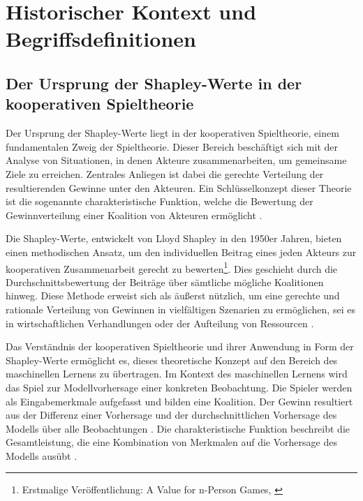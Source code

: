 \chapter{Historischer Kontext und Begriffsdefinitionen}



\section{Der Ursprung der Shapley-Werte in der kooperativen Spieltheorie}

Der Ursprung der Shapley-Werte liegt in der kooperativen Spieltheorie, einem fundamentalen Zweig der Spieltheorie. 
Dieser Bereich beschäftigt sich mit der Analyse von Situationen, in denen Akteure zusammenarbeiten, um gemeinsame Ziele zu erreichen. 
Zentrales Anliegen ist dabei die gerechte Verteilung der resultierenden Gewinne unter den Akteuren. Ein Schlüsselkonzept dieser Theorie 
ist die sogenannte charakteristische Funktion, welche die Bewertung der Gewinnverteilung einer Koalition von Akteuren ermöglicht \cite[S. 12]{Molnar_2023}.

Die Shapley-Werte, entwickelt von Lloyd Shapley in den 1950er Jahren, bieten einen methodischen Ansatz, um den individuellen Beitrag 
eines jeden Akteurs zur kooperativen Zusammenarbeit gerecht zu bewerten\footnote{Erstmalige Veröffentlichung: \glqq{}A Value for n-Person Games\grqq{}, \cite[S. 307-318]{Shapley+1953+307+318}}. 
Dies geschieht durch die Durchschnittsbewertung der Beiträge 
über sämtliche mögliche Koalitionen hinweg. Diese Methode erweist sich als äußerst nützlich, um eine gerechte und rationale Verteilung 
von Gewinnen in vielfältigen Szenarien zu ermöglichen, sei es in wirtschaftlichen Verhandlungen oder der Aufteilung von Ressourcen \cite[S. 5572]{ijcai2022p778}.

Das Verständnis der kooperativen Spieltheorie und ihrer Anwendung in Form der Shapley-Werte ermöglicht es, dieses theoretische Konzept 
auf den Bereich des maschinellen Lernens zu übertragen. Im Kontext des maschinellen Lernens wird das Spiel zur Modellvorhersage einer konkreten
Beobachtung. Die Spieler werden als Eingabemerkmale aufgefasst und bilden eine Koalition. Der Gewinn resultiert aus der Differenz einer Vorhersage und der durchschnittlichen Vorhersage des
Modells über alle Beobachtungen \cite[S. 215]{Molnar_2022}. Die charakteristische Funktion beschreibt die Gesamtleistung, 
die eine Kombination von Merkmalen auf die Vorhersage des Modells ausübt \cite[S. 5572]{ijcai2022p778}.

